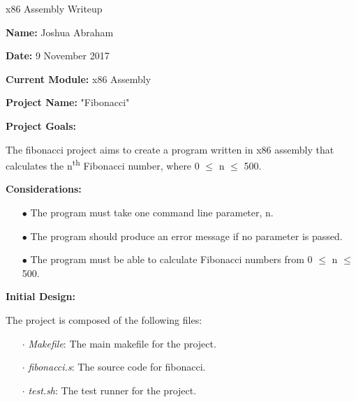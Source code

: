 \documentclass{article}
\begin{document}
\centerline{\sc \large x86 Assembly Writeup}
\vspace{.5pc}

\begin{flushleft}
\textbf{Name:} Joshua Abraham
\vspace{.5pc}

\textbf{Date:} 9 November 2017
\vspace{.5pc}

\textbf{Current Module:} x86 Assembly
\vspace{.5pc}

\textbf{Project Name:} "Fibonacci"
\vspace{.5pc}

\textbf{Project Goals:}
\vspace{.5pc}
\end{flushleft}

The fibonacci project aims to create a program written in x86 assembly that calculates the 
n\textsuperscript{th} Fibonacci number, where 0 $\leq$ n $\leq$	500.
\vspace{.5pc}

\begin{flushleft}
\textbf{Considerations:}
\vspace{.5pc}
\end{flushleft}

\begin{itemize}
	\item[$\bullet$] The program must take one command line parameter, n.
	\item[$\bullet$] The program should produce an error message if no 
	parameter is passed.
	\item[$\bullet$] The program must be able to calculate Fibonacci numbers 
	from 0 $\leq$ n $\leq$ 500.
\end{itemize}
\vspace{.5pc}

\begin{flushleft}
\textbf{Initial Design:}
\vspace{.5pc}
\end{flushleft}

The project is composed of the following files:
\begin{itemize}
	\item [$\cdot$] \textit{Makefile}: The main makefile for the project.
	\item [$\cdot$] \textit{fibonacci.s}: The source code for fibonacci.
	\item [$\cdot$] \textit{test.sh}: The test runner for the project.
\end{itemize}
\vspace{2mm}
\end{document}
